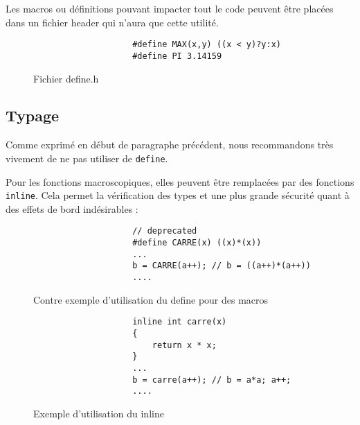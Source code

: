 			Les macros ou définitions pouvant impacter tout le code peuvent être placées dans un fichier header qui n'aura que cette utilité.
			
			\begin{figure}[H]
				\begin{changemargin}{-2.5cm}{-2.5cm}
				\begin{tcolorbox}
				\begin{verbatim}
					#define MAX(x,y) ((x < y)?y:x)
					#define PI 3.14159
				\end{verbatim}
				\end{tcolorbox}
				\end{changemargin}
				\caption{Fichier define.h}
			\end{figure}

		\subsection{Typage}
			Comme exprimé en début de paragraphe précédent, nous recommandons très vivement de ne pas utiliser de \verb+define+.

			Pour les fonctions macroscopiques, elles peuvent être remplacées par des fonctions \verb+inline+. Cela permet la vérification des types et une plus grande sécurité quant à des effets de bord indésirables :

			\begin{figure}[H]
				\begin{changemargin}{-2.5cm}{-2.5cm}
				\begin{tcolorbox}
				\begin{verbatim}
					// deprecated
					#define CARRE(x) ((x)*(x))
					...
					b = CARRE(a++); // b = ((a++)*(a++))
					....
				\end{verbatim}
				\end{tcolorbox}
				\end{changemargin}
				\caption{Contre exemple d'utilisation du define pour des macros}
				

				\begin{changemargin}{-2.5cm}{-2.5cm}
				\begin{tcolorbox}
				\begin{verbatim}
					inline int carre(x)
					{
					    return x * x;
					}
					...
					b = carre(a++); // b = a*a; a++;
					....
				\end{verbatim}
				\end{tcolorbox}
				\end{changemargin}
				\caption{Exemple d'utilisation du inline}
			\end{figure}

